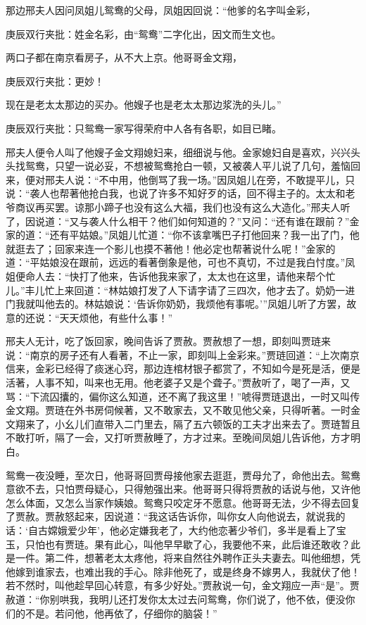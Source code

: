 \begin{parag}
    那边邢夫人因问凤姐儿鸳鸯的父母，凤姐因回说：“他爹的名字叫金彩，\begin{note}庚辰双行夹批：姓金名彩，由“鸳鸯”二字化出，因文而生文也。\end{note}两口子都在南京看房子，从不大上京。他哥哥金文翔，\begin{note}庚辰双行夹批：更妙！\end{note}现在是老太太那边的买办。他嫂子也是老太太那边浆洗的头儿。”\begin{note}庚辰双行夹批：只鸳鸯一家写得荣府中人各有各职，如目已睹。\end{note}邢夫人便令人叫了他嫂子金文翔媳妇来，细细说与他。金家媳妇自是喜欢，兴兴头头找鸳鸯，只望一说必妥，不想被鸳鸯抢白一顿，又被袭人平儿说了几句，羞恼回来，便对邢夫人说：“不中用，他倒骂了我一场。”因凤姐儿在旁，不敢提平儿，只说：“袭人也帮著他抢白我，也说了许多不知好歹的话，回不得主子的。太太和老爷商议再买罢。谅那小蹄子也没有这么大福，我们也没有这么大造化。”邢夫人听了，因说道：“又与袭人什么相干？他们如何知道的？”又问：“还有谁在跟前？”金家的道：“还有平姑娘。”凤姐儿忙道：“你不该拿嘴巴子打他回来？我一出了门，他就逛去了；回家来连一个影儿也摸不著他！他必定也帮著说什么呢！”金家的道：“平姑娘没在跟前，远远的看著倒象是他，可也不真切，不过是我白忖度。”凤姐便命人去：“快打了他来，告诉他我来家了，太太也在这里，请他来帮个忙儿。”丰儿忙上来回道：“林姑娘打发了人下请字请了三四次，他才去了。奶奶一进门我就叫他去的。林姑娘说：‘告诉你奶奶，我烦他有事呢。’”凤姐儿听了方罢，故意的还说：“天天烦他，有些什么事！”
\end{parag}


\begin{parag}
    邢夫人无计，吃了饭回家，晚间告诉了贾赦。贾赦想了一想，即刻叫贾琏来说：“南京的房子还有人看著，不止一家，即刻叫上金彩来。”贾琏回道：“上次南京信来，金彩已经得了痰迷心窍，那边连棺材银子都赏了，不知如今是死是活，便是活著，人事不知，叫来也无用。他老婆子又是个聋子。”贾赦听了，喝了一声，又骂：“下流囚攮的，偏你这么知道，还不离了我这里！”唬得贾琏退出，一时又叫传金文翔。贾琏在外书房伺候著，又不敢家去，又不敢见他父亲，只得听著。一时金文翔来了，小幺儿们直带入二门里去，隔了五六顿饭的工夫才出来去了。贾琏暂且不敢打听，隔了一会，又打听贾赦睡了，方才过来。至晚间凤姐儿告诉他，方才明白。
\end{parag}


\begin{parag}
    鸳鸯一夜没睡，至次日，他哥哥回贾母接他家去逛逛，贾母允了，命他出去。鸳鸯意欲不去，只怕贾母疑心，只得勉强出来。他哥哥只得将贾赦的话说与他，又许他怎么体面，又怎么当家作姨娘。鸳鸯只咬定牙不愿意。他哥哥无法，少不得去回复了贾赦。贾赦怒起来，因说道：“我这话告诉你，叫你女人向他说去，就说我的话：‘自古嫦娥爱少年’，他必定嫌我老了，大约他恋著少爷们，多半是看上了宝玉，只怕也有贾琏。果有此心，叫他早早歇了心，我要他不来，此后谁还敢收？此是一件。第二件，想著老太太疼他，将来自然往外聘作正头夫妻去。叫他细想，凭他嫁到谁家去，也难出我的手心。除非他死了，或是终身不嫁男人，我就伏了他！若不然时，叫他趁早回心转意，有多少好处。”贾赦说一句，金文翔应一声“是”。贾赦道：“你别哄我，我明儿还打发你太太过去问鸳鸯，你们说了，他不依，便没你们的不是。若问他，他再依了，仔细你的脑袋！”
\end{parag}


